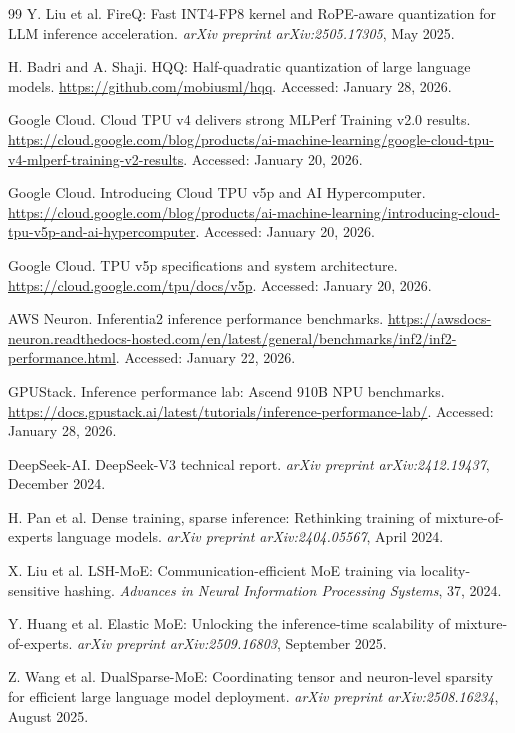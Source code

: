 \documentclass[11pt]{article}
\begin{document}
\begin{thebibliography}{99}
 Y. Liu et al. FireQ: Fast INT4-FP8 kernel and RoPE-aware quantization for LLM inference acceleration. \textit{arXiv preprint arXiv:2505.17305}, May 2025.


 H. Badri and A. Shaji. HQQ: Half-quadratic quantization of large language models. \url{https://github.com/mobiusml/hqq}. Accessed: January 28, 2026.


 Google Cloud. Cloud TPU v4 delivers strong MLPerf Training v2.0 results. \url{https://cloud.google.com/blog/products/ai-machine-learning/google-cloud-tpu-v4-mlperf-training-v2-results}. Accessed: January 20, 2026.

 Google Cloud. Introducing Cloud TPU v5p and AI Hypercomputer. \url{https://cloud.google.com/blog/products/ai-machine-learning/introducing-cloud-tpu-v5p-and-ai-hypercomputer}. Accessed: January 20, 2026.

 Google Cloud. TPU v5p specifications and system architecture. \url{https://cloud.google.com/tpu/docs/v5p}. Accessed: January 20, 2026.

 AWS Neuron. Inferentia2 inference performance benchmarks. \url{https://awsdocs-neuron.readthedocs-hosted.com/en/latest/general/benchmarks/inf2/inf2-performance.html}. Accessed: January 22, 2026.

 GPUStack. Inference performance lab: Ascend 910B NPU benchmarks. \url{https://docs.gpustack.ai/latest/tutorials/inference-performance-lab/}. Accessed: January 28, 2026.


 DeepSeek-AI. DeepSeek-V3 technical report. \textit{arXiv preprint arXiv:2412.19437}, December 2024.

 H. Pan et al. Dense training, sparse inference: Rethinking training of mixture-of-experts language models. \textit{arXiv preprint arXiv:2404.05567}, April 2024.

 X. Liu et al. LSH-MoE: Communication-efficient MoE training via locality-sensitive hashing. \textit{Advances in Neural Information Processing Systems}, 37, 2024.

 Y. Huang et al. Elastic MoE: Unlocking the inference-time scalability of mixture-of-experts. \textit{arXiv preprint arXiv:2509.16803}, September 2025.

 Z. Wang et al. DualSparse-MoE: Coordinating tensor and neuron-level sparsity for efficient large language model deployment. \textit{arXiv preprint arXiv:2508.16234}, August 2025.

\end{thebibliography}
\end{document}
